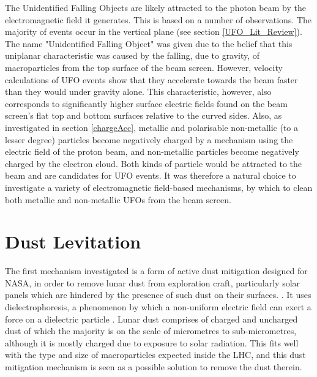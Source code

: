 \documentclass[../main.tex]{subfiles}
\begin{document}
The Unidentified Falling Objects are likely attracted to the photon beam by the electromagnetic field it generates.
This is based on a number of observations.
The majority of events occur in the vertical plane (see section \ref{UFO_Lit_Review}).
The name "Unidentified Falling Object" was given due to the belief that this uniplanar characteristic was caused by the falling, due to gravity, of macroparticles from the top surface of the beam screen.
However, velocity calculations of UFO events show that they accelerate towards the beam faster than they would under gravity alone.
This characteristic, however, also corresponds to significantly higher surface electric fields found on the beam screen's flat top and bottom surfaces relative to the curved sides.
Also, as investigated in section \ref{chargeAcc}, metallic and polarisable non-metallic (to a lesser degree) particles become negatively charged by a mechanism using the electric field of the proton beam, and non-metallic particles become negatively charged by the electron cloud.
Both kinds of particle would be attracted to the beam and are candidates for UFO events.
It was therefore a natural choice to investigate a variety of electromagnetic field-based mechanisms, by which to clean both metallic and non-metallic UFOs from the beam screen.


\section{Dust Levitation}
The first mechanism investigated is a form of active dust mitigation designed for NASA, in order to remove lunar dust from exploration craft, particularly solar panels which are hindered by the presence of such dust on their surfaces. \cite{nasa_dep}.
It uses dielectrophoresis, a phenomenon by which a non-uniform electric field can exert a force on a dielectric particle \cite{esseling_dep}.
Lunar dust comprises of charged and uncharged dust of which the majority is on the scale of micrometres to sub-micrometres, although it is mostly charged due to exposure to solar radiation.
This fits well with the type and size of macroparticles expected inside the LHC, and this dust mitigation mechanism is seen as a possible solution to remove the dust therein. 
\end{document}
